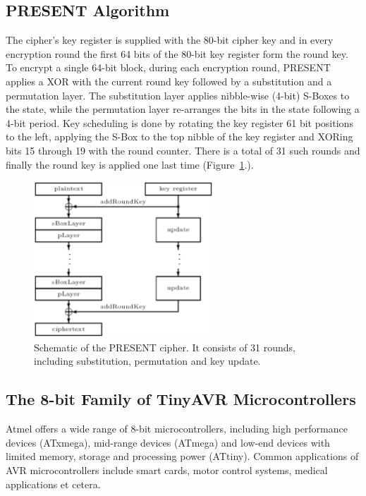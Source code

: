 \documentclass[11pt]{llncs2e} %
\begin{document}
\subsection{PRESENT Algorithm}
The cipher's key register is supplied with the 80-bit cipher key and in every encryption round the first 64 bits of the 80-bit key register form the round key.
To encrypt a single 64-bit block, during each encryption round, PRESENT applies a XOR with the current round key followed by a substitution and a permutation layer.
The substitution layer applies nibble-wise (4-bit) S-Boxes to the state, while the permutation layer re-arranges the bits in the state following a 4-bit period.
Key scheduling is done by rotating the key register 61 bit positions to the left, applying the S-Box to the top nibble of the key register and XORing bits 15 through 19 with the round counter.
There is a total of 31 such rounds and finally the round key is applied one last time 
(Figure~\ref{present_schematic}.).


\begin{figure}[H]
	\label{present_schematic}
	\centering
	 \includegraphics [width=0.6\textwidth]{present.eps}
\caption{\footnotesize Schematic of the PRESENT cipher. It consists of 31 rounds, including substitution, permutation and key update.}
\end{figure}
\subsection{The 8-bit Family of TinyAVR Microcontrollers}
Atmel offers a wide range of 8-bit microcontrollers, including high performance devices (ATxmega), mid-range devices (ATmega) and low-end devices with limited memory, storage and processing power (ATtiny). Common applications of AVR microcontrollers include smart cards, motor control systems, medical applications et cetera. 
\end{document}
